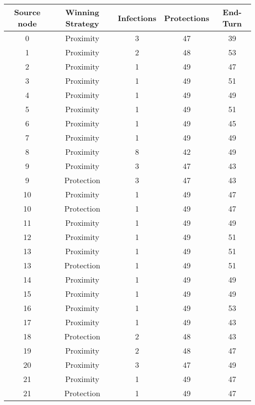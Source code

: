 \documentclass[results.tex]{subfiles}
\begin{document}
\begin{center}
  \begin{tabular}{| c || c | c | c | c |}
    \hline
    {\bfseries Source node} & {\bfseries Winning Strategy} & {\bfseries Infections} & {\bfseries Protections} & {\bfseries End-Turn} \\  %
    \hline\hline
    0 & Proximity & 3 & 47 & 39 \\ 
    \hline
    1 & Proximity & 2 & 48 & 53 \\ 
    \hline
    2 & Proximity & 1 & 49 & 47 \\ 
    \hline
    3 & Proximity & 1 & 49 & 51 \\ 
    \hline
    4 & Proximity & 1 & 49 & 49 \\ 
    \hline
    5 & Proximity & 1 & 49 & 51 \\ 
    \hline
    6 & Proximity & 1 & 49 & 45 \\ 
    \hline
    7 & Proximity & 1 & 49 & 49 \\ 
    \hline
    8 & Proximity & 8 & 42 & 49 \\ 
    \hline
    9 & Proximity & 3 & 47 & 43 \\ 
    \hline
    9 & Protection & 3 & 47 & 43 \\ 
    \hline
    10 & Proximity & 1 & 49 & 47 \\ 
    \hline
    10 & Protection & 1 & 49 & 47 \\ 
    \hline
    11 & Proximity & 1 & 49 & 49 \\ 
    \hline
    12 & Proximity & 1 & 49 & 51 \\ 
    \hline
    13 & Proximity & 1 & 49 & 51 \\ 
    \hline
    13 & Protection & 1 & 49 & 51 \\ 
    \hline
    14 & Proximity & 1 & 49 & 49 \\ 
    \hline
    15 & Proximity & 1 & 49 & 49 \\ 
    \hline
    16 & Proximity & 1 & 49 & 53 \\ 
    \hline
    17 & Proximity & 1 & 49 & 43 \\ 
    \hline
    18 & Protection & 2 & 48 & 43 \\ 
    \hline
    19 & Proximity & 2 & 48 & 47 \\ 
    \hline
    20 & Proximity & 3 & 47 & 49 \\ 
    \hline
    21 & Proximity & 1 & 49 & 47 \\ 
    \hline
    21 & Protection & 1 & 49 & 47 \\ 

\end{tabular}
\end{center}
\end{document}
